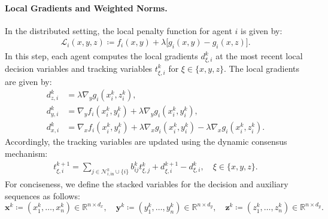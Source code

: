 \documentclass{article}
\theoremstyle{plain}
\theoremstyle{definition}
\theoremstyle{remark}
\begin{document}
\paragraph{Local Gradients and Weighted Norms.} 
In the distributed setting, the local penalty function for agent $i$ is given by: 
\begin{align*}
  \mathcal{L}_i(x, y, z) \coloneqq f_i(x, y) + \lambda \big[ g_i(x, y) - g_i(x, z) \big].
\end{align*}
In this step, each agent computes the local gradients $d_{\xi,i}^{k}$ at the most recent local decision variables and tracking variables $t_{\xi,i}^{k}$ for $\xi \in \{x, y, z\}$. 
The local gradients are given by: 
\begin{subequations}\label{local_grad}
\begin{align}
    d_{z,i}^{k} &= \lambda \nabla_{y} g_i(x_i^k, z_i^k), \label{localgrad_z} \\
    d_{y,i}^{k} &= \nabla_{y} f_i(x_i^{k}, y_i^{k}) + \lambda \nabla_{y} g_i(x_i^k, y_i^k), \label{localgrad_y} \\
    d_{x,i}^{k} &= \nabla_{x} f_i(x_i^{k}, y_i^{k}) + \lambda \nabla_{x} g_i(x_i^k, y_i^k) - \lambda \nabla_{x} g_i(x_i^k, z_i^k). \label{localgrad_x}
\end{align}
\end{subequations}
Accordingly, the tracking variables are updated using the dynamic consensus mechanism: 
\begin{align*}
    t_{\xi,i}^{k+1} = \sum_{j\in\mathcal{N}_{i,\mathrm{in}}^{k}\cup\{i\}}b_{ij}^{k}t_{\xi,j}^{k} + d_{\xi,i}^{k+1} - d_{\xi,i}^{k},\quad \xi \in \{x,y,z\}.
\end{align*}
For conciseness, we define the stacked variables for the decision and auxiliary sequences as follows: 
\begin{equation}\label{eq:stacked_defs}
    \mathbf{x}^{k} \coloneqq (x_{1}^{k}, \ldots, x_{n}^{k}) \in \mathbb{R}^{n \times d_x}, \quad 
    \mathbf{y}^{k} \coloneqq (y_{1}^{k}, \ldots, y_{n}^{k}) \in \mathbb{R}^{n \times d_y}, \quad 
    \mathbf{z}^{k} \coloneqq (z_{1}^{k}, \ldots, z_{n}^{k}) \in \mathbb{R}^{n \times d_y}.
\end{equation}
\end{document}
